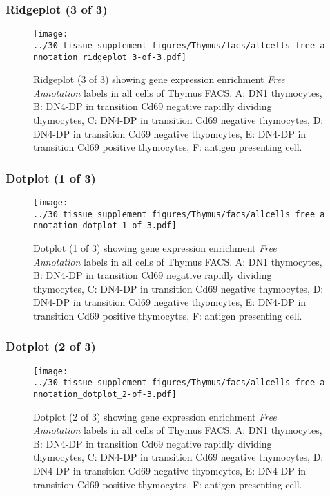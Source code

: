 \clearpage

\subsubsection{Ridgeplot (3 of 3)}
\begin{figure}[h]
\centering
\texttt{[image: ../30\_tissue\_supplement\_figures/Thymus/facs/allcells\_free\_annotation\_ridgeplot\_3-of-3.pdf]}

\caption{ Ridgeplot (3 of 3)  showing gene expression enrichment \emph{Free Annotation} labels in all cells of Thymus FACS. A: DN1 thymocytes, B: DN4-DP in transition Cd69 negative rapidly dividing thymocytes, C: DN4-DP in transition Cd69 negative thymocytes, D: DN4-DP in transition Cd69 negative thyomcytes, E: DN4-DP in transition Cd69 positive thymocytes, F: antigen presenting cell.}
\end{figure}


\clearpage

\subsubsection{Dotplot (1 of 3)}
\begin{figure}[h]
\centering
\texttt{[image: ../30\_tissue\_supplement\_figures/Thymus/facs/allcells\_free\_annotation\_dotplot\_1-of-3.pdf]}

\caption{ Dotplot (1 of 3)  showing gene expression enrichment \emph{Free Annotation} labels in all cells of Thymus FACS. A: DN1 thymocytes, B: DN4-DP in transition Cd69 negative rapidly dividing thymocytes, C: DN4-DP in transition Cd69 negative thymocytes, D: DN4-DP in transition Cd69 negative thyomcytes, E: DN4-DP in transition Cd69 positive thymocytes, F: antigen presenting cell.}
\end{figure}


\clearpage

\subsubsection{Dotplot (2 of 3)}
\begin{figure}[h]
\centering
\texttt{[image: ../30\_tissue\_supplement\_figures/Thymus/facs/allcells\_free\_annotation\_dotplot\_2-of-3.pdf]}

\caption{ Dotplot (2 of 3)  showing gene expression enrichment \emph{Free Annotation} labels in all cells of Thymus FACS. A: DN1 thymocytes, B: DN4-DP in transition Cd69 negative rapidly dividing thymocytes, C: DN4-DP in transition Cd69 negative thymocytes, D: DN4-DP in transition Cd69 negative thyomcytes, E: DN4-DP in transition Cd69 positive thymocytes, F: antigen presenting cell.}
\end{figure}


